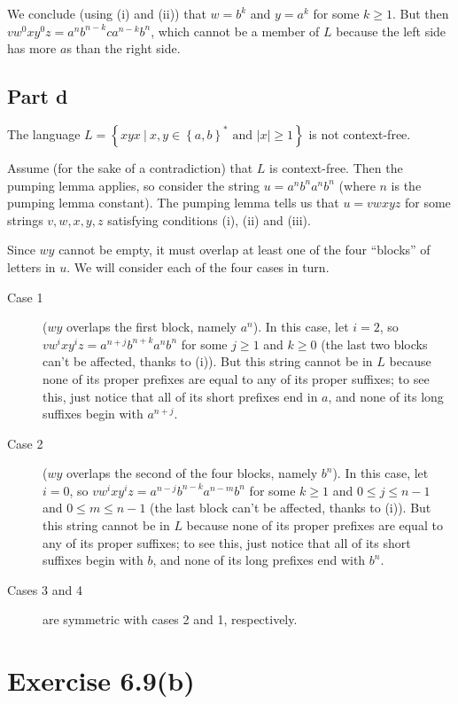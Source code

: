 \documentclass[12pt]{article}
\newcommand{\set}[1]{\left\{#1\right\}}
\newcommand{\Set}[2]{\set{#1\ |\ #2}}
\begin{document}
      We conclude (using (i) and (ii)) that $w=b^k$ and $y=a^k$ for some $k\geq1$. But then $vw^0xy^0z=a^nb^{n-k}ca^{n-k}b^n$, which cannot be a member of $L$ because the left side has more $a$s than the right side.
  \subsection{Part d}
    The language $L=\Set{xyx}{\text{$x,y\in\set{a,b}^*$ and $|x|\geq1$}}$ is not context-free.

    Assume (for the sake of a contradiction) that $L$ is context-free. Then the pumping lemma applies, so consider the string $u=a^nb^na^nb^n$ (where $n$ is the pumping lemma constant). The pumping lemma tells us that $u=vwxyz$ for some strings $v,w,x,y,z$ satisfying conditions (i), (ii) and (iii).

    Since $wy$ cannot be empty, it must overlap at least one of the four ``blocks'' of letters in $u$. We will consider each of the four cases in turn.
    \begin{description}
      \item[Case 1]
        ($wy$ overlaps the first block, namely $a^n$). In this case, let $i=2$, so $vw^ixy^iz=a^{n+j}b^{n+k}a^nb^n$ for some $j\geq1$ and $k\geq0$ (the last two blocks can't be affected, thanks to (i)). But this string cannot be in $L$ because none of its proper prefixes are equal to any of its proper suffixes; to see this, just notice that all of its short prefixes end in $a$, and none of its long suffixes begin with $a^{n+j}$.
      \item[Case 2]
        ($wy$ overlaps the second of the four blocks, namely $b^n$). In this case, let $i=0$, so $vw^ixy^iz=a^{n-j}b^{n-k}a^{n-m}b^n$ for some $k\geq1$ and $0\leq j\leq n-1$ and $0\leq m\leq n-1$ (the last block can't be affected, thanks to (i)). But this string cannot be in $L$ because none of its proper prefixes are equal to any of its proper suffixes; to see this, just notice that all of its short suffixes begin with $b$, and none of its long prefixes end with $b^n$.
      \item[Cases 3 and 4]
        are symmetric with cases 2 and 1, respectively.
    \end{description}
\section{Exercise 6.9(b)}
\end{document}
